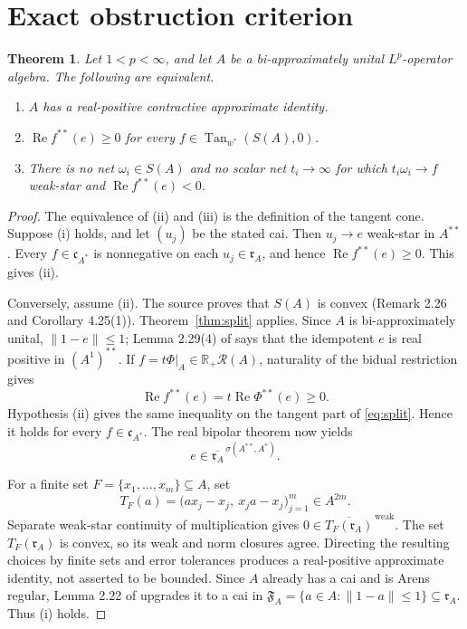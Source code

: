 \documentclass[11pt]{article}
\newtheorem{theorem}{Theorem}
\newcommand{\R}{\mathbb R}
\newcommand{\rA}{\mathfrak r_A}
\newcommand{\cA}{\mathfrak c_{A^*}}
\newcommand{\Tan}{\operatorname{Tan}_{w^*}}
\begin{document}
\section*{Exact obstruction criterion}
\begin{theorem}\label{thm:criterion}
Let $1<p<\infty$, and let $A$ be a bi-approximately unital $L^p$-operator
algebra.  The following are equivalent.
\begin{enumerate}[label=\textup{(\roman*)},leftmargin=2.4em]
\item $A$ has a real-positive contractive approximate identity.
\item $\operatorname{Re}f^{**}(e)\geq0$ for every
$f\in\Tan(S(A),0)$.
\item There is no net $\omega_i\in S(A)$ and no scalar net
$t_i\to\infty$ for which $t_i\omega_i\to f$ weak-star and
$\operatorname{Re}f^{**}(e)<0$.
\end{enumerate}
\end{theorem}

\begin{proof}
The equivalence of \textup{(ii)} and \textup{(iii)} is the definition of the
tangent cone.  Suppose \textup{(i)} holds, and let $(u_j)$ be the stated cai.
Then $u_j\to e$ weak-star in $A^{**}$.  Every $f\in\cA$ is nonnegative on
each $u_j\in\rA$, and hence
$\operatorname{Re}f^{**}(e)\geq0$.  This gives \textup{(ii)}.

Conversely, assume \textup{(ii)}.  The source proves that $S(A)$ is convex
(Remark 2.26 and Corollary 4.25(1)).  Theorem~\ref{thm:split} applies.  Since
$A$ is bi-approximately unital, $\|1-e\|\leq1$; Lemma 2.29(4) of
\cite{Source} says that the idempotent $e$ is real positive in
$(A^1)^{**}$.  If $f=t\Phi|_A\in\R_+\mathcal R(A)$, naturality of the
bidual restriction gives
\[
 \operatorname{Re}f^{**}(e)
 =t\operatorname{Re}\Phi^{**}(e)\geq0.
\]
Hypothesis \textup{(ii)} gives the same inequality on the tangent part of
\eqref{eq:split}.  Hence it holds for every $f\in\cA$.  The real bipolar
theorem now yields
\[
 e\in\overline{\rA}^{\,\sigma(A^{**},A^*)}.
\]

For a finite set $F=\{x_1,\ldots,x_m\}\subseteq A$, set
\[
 T_F(a)=\bigl(ax_j-x_j,\ x_ja-x_j\bigr)_{j=1}^m\in A^{2m}.
\]
Separate weak-star continuity of multiplication gives
$0\in\overline{T_F(\rA)}^{\,\mathrm{weak}}$.  The set $T_F(\rA)$ is
convex, so its weak and norm closures agree.  Directing the resulting choices
by finite sets and error tolerances produces a real-positive approximate
identity, not asserted to be bounded.  Since $A$ already has a cai and is
Arens regular, Lemma 2.22 of \cite{Source} upgrades it to a cai in
$\mathfrak F_A=\{a\in A:\|1-a\|\leq1\}\subseteq\rA$.  Thus \textup{(i)}
holds.
\end{proof}
\end{document}
